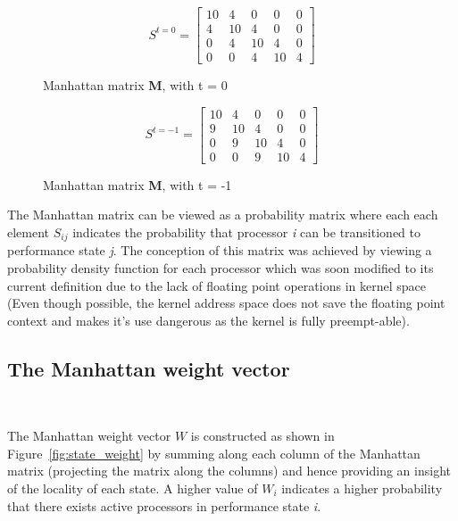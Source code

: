 \begin{figure}[h!]
\centering
\begin{equation*}
    S^{t = 0} = \left[
     \begin{array}{ccccc}
       10 & 4 & 0 & 0 & 0 \\
       4 & 10 & 4 & 0 & 0 \\
       0 & 4 & 10 & 4 & 0 \\
       0 & 0 & 4 & 10 & 4
     \end{array}
   \right]
\end{equation*}
\caption{Manhattan matrix \textbf{M}, with t = 0}
\label{fig:ex_dmut0}
\end{figure}

\begin{figure}[h!]
\centering
\begin{equation*}
    S^{t = -1} = \left[
     \begin{array}{ccccc}
       10 & 4 & 0 & 0 & 0 \\
       9 & 10 & 4 & 0 & 0 \\
       0 & 9 & 10 & 4 & 0 \\
       0 & 0 & 9 & 10 & 4
     \end{array}
   \right]
\end{equation*}
\caption{Manhattan matrix \textbf{M}, with t = -1}
\label{fig:ex_dmutl}
\end{figure}

The Manhattan matrix can be viewed as a probability matrix where each each element
$S_{ij}$ indicates the probability that processor \textit{i} can be transitioned to
performance state \textit{j}. The conception of this matrix was achieved by viewing
a probability density function for each processor which was soon modified to its
current definition due to the lack of floating point operations in kernel space 
(Even though possible, the kernel address space does not save the floating point 
context and makes it's use dangerous as the kernel is fully preempt-able).

\subsection{The Manhattan weight vector}~\label{sec:weight}

The Manhattan weight vector $W$ is constructed as shown in Figure~\ref{fig:state_weight} by summing along each column 
of the Manhattan matrix (projecting the matrix along the columns) and hence
providing an insight of the locality of each state. A higher value of $W_i$ 
indicates a higher probability that there exists active processors in 
performance state \textit{i}. 

